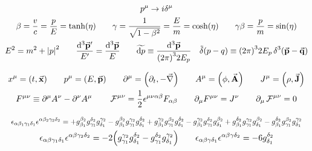 \begin{gather*}
        p^\mu \to i \delta^\mu
        \\
        \beta
        = \frac{v}{c}
        = \frac{p}{E}
        = \tanh(\eta)
        \qquad
        \gamma
        = \frac{1}{\sqrt{1-\beta^2}}
        = \frac{E}{m}
        = \cosh(\eta)
        \qquad
        \gamma\beta
        = \frac{p}{m}
        = \sin(\eta)
        \\
        E^2 = m^2 + \abs{p}^2
        \qquad
        \frac{\dd[3]{\va{p}'}}{E'} = \frac{\dd[3]{\va{p}}}{E}
        \qquad
        \widetilde{\dd{p}} \equiv \frac{\dd[3]{\va{p}}}{\qty(2\pi)^32E_p}
        \quad
        \tilde{\delta}\qty(p-q) \equiv \qty(2\pi)^32E_p\Ddelta[3](\va{p}-\va{q})
\end{gather*}

\begin{gather*}
        x^{\mu} = (t, \va{x})
        \qquad
        p^{\mu} = (E, \va{p})
        \qquad
        \partial^{\mu} = \qty(\partial_t, -\va{\nabla})
        \qquad
        A^{\mu} = \qty(\phi, \va{A})
        \qquad
        J^{\mu} = \qty(\rho, \va{J})
        \\
        F^{\mu\nu} \equiv \partial^\mu A^\nu - \partial^\nu A^\mu
        \qquad
        \operatorname{\mathcal{F}}^{\mu\nu} = \frac{1}{2}\epsilon^{\mu\nu\alpha\beta}F_{\alpha\beta}
        \qquad
        \partial_\mu F^{\mu\nu} = J^{\nu}
        \qquad
        \partial_\mu \operatorname{\mathcal{F}}^{\mu\nu} = 0
\end{gather*}

\begin{gather*}
        \resizebox{\linewidth}{!}{$\displaystyle
                \epsilon_{\alpha\beta_1\gamma_1\delta_1}\epsilon^{\alpha\beta_2\gamma_2\delta_2}
                =
                + g^{\beta_2}_{\beta_1}g^{\delta_2}_{\gamma_1}g^{\gamma_2}_{\delta_1}
                - g^{\beta_2}_{\beta_1}g^{\gamma_2}_{\gamma_1}g^{\delta_2}_{\delta_1}
                + g^{\gamma_2}_{\beta_1}g^{\beta_2}_{\gamma_1}g^{\delta_2}_{\delta_1}
                - g^{\gamma_2}_{\beta_1}g^{\delta_2}_{\gamma_1}g^{\beta_2}_{\delta_1}
                + g^{\delta_2}_{\beta_1}g^{\gamma_2}_{\gamma_1}g^{\beta_2}_{\delta_1}
                - g^{\delta_2}_{\beta_1}g^{\beta_2}_{\gamma_1}g^{\gamma_2}_{\delta_1}
        $}
        \\
        \epsilon_{\alpha\beta\gamma_1\delta_1}\epsilon^{\alpha\beta\gamma_2\delta_2} = -2\qty(g_{\gamma_1}^{\gamma_2}g_{\delta_1}^{\delta_2} - g_{\gamma_1}^{\delta_2}g_{\delta_1}^{\gamma_2})
        \qquad
        \epsilon_{\alpha\beta\gamma\delta_1}\epsilon^{\alpha\beta\gamma\delta_2} = -6g_{\delta_1}^{\delta_2}
\end{gather*}
